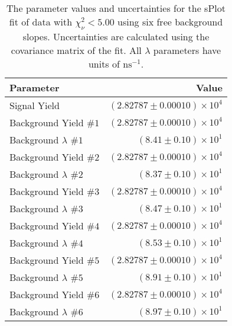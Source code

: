 
\begin{table}[ht]
    \begin{center}
        \begin{tabular}{lr}\toprule
            Parameter & Value \\\midrule
            Signal Yield & $(2.82787 \pm 0.00010) \times 10^{4}$ \\
            Background Yield $\#1$ & $(2.82787 \pm 0.00010) \times 10^{4}$ \\
            Background $\lambda$ $\#1$ & $(8.41 \pm 0.10) \times 10^{1}$ \\
            Background Yield $\#2$ & $(2.82787 \pm 0.00010) \times 10^{4}$ \\
            Background $\lambda$ $\#2$ & $(8.37 \pm 0.10) \times 10^{1}$ \\
            Background Yield $\#3$ & $(2.82787 \pm 0.00010) \times 10^{4}$ \\
            Background $\lambda$ $\#3$ & $(8.47 \pm 0.10) \times 10^{1}$ \\
            Background Yield $\#4$ & $(2.82787 \pm 0.00010) \times 10^{4}$ \\
            Background $\lambda$ $\#4$ & $(8.53 \pm 0.10) \times 10^{1}$ \\
            Background Yield $\#5$ & $(2.82787 \pm 0.00010) \times 10^{4}$ \\
            Background $\lambda$ $\#5$ & $(8.91 \pm 0.10) \times 10^{1}$ \\
            Background Yield $\#6$ & $(2.82787 \pm 0.00010) \times 10^{4}$ \\
            Background $\lambda$ $\#6$ & $(8.97 \pm 0.10) \times 10^{1}$ \\\bottomrule
        \end{tabular}
        \caption{The parameter values and uncertainties for the sPlot fit of data with $\chi^2_\nu < 5.00$ using six free background slopes. Uncertainties are calculated using the covariance matrix of the fit. All $\lambda$ parameters have units of $\si{\nano\second}^{-1}$.}\label{tab:splot-fit-results-chisqdof-5.00-free-6}
    \end{center}
\end{table}
